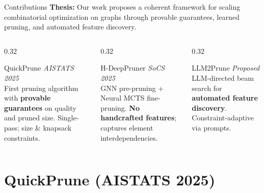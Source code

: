 \documentclass[aspectratio=169,xcolor=dvipsnames,8pt]{beamer}
\begin{document}
\begin{frame}{Contributions}
  \textbf{Thesis:} Our work proposes a coherent framework for scaling
  combinatorial optimization on graphs through provable guarantees, learned
  pruning, and automated feature discovery.

  \vspace{0.25cm}

  \begin{columns}[T]
    \begin{column}{0.32\textwidth}
      \begin{block}{\faCheckCircle\; QuickPrune}
        \textit{AISTATS 2025}~\cite{pmlr-v258-nath25a}\\[4pt]
        First pruning algorithm with \textbf{provable guarantees} on quality and pruned size.
        Single-pass; size \& knapsack constraints.
      \end{block}
    \end{column}
    \begin{column}{0.32\textwidth}
      \begin{block}{\faCheckCircle\; H-DeepPruner}
        \textit{SoCS 2025}~\cite{nath2025hdeeppruner}\\[4pt]
        GNN pre-pruning + Neural MCTS fine-pruning.
        \textbf{No handcrafted features}; captures element interdependencies.
      \end{block}
    \end{column}
    \begin{column}{0.32\textwidth}
      \begin{block}{\faLightbulb\; LLM2Prune}
        \textit{Proposed}\\[4pt]
        LLM-directed beam search for \textbf{automated feature discovery}.
        Constraint-adaptive via prompts.
      \end{block}
    \end{column}
  \end{columns}
\end{frame}

\section{QuickPrune (AISTATS 2025)}
\end{document}
